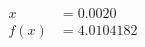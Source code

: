 \documentclass[preview]{standalone}
\begin{document}
\begin{align*}
x &= 0.0020\\f(x) &= 4.0104182
\end{align*}
\end{document}
